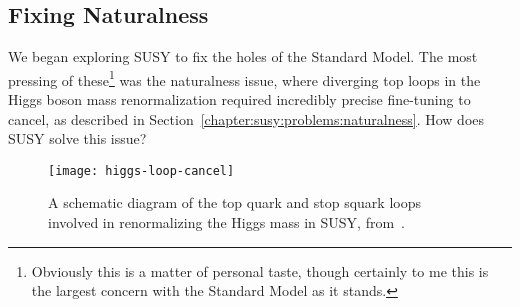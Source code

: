 



\subsection{Fixing Naturalness}

We began exploring SUSY to fix the holes of the Standard Model. The most pressing of these\footnote{Obviously this is a matter of personal taste, though certainly to me this is the largest concern with the Standard Model as it stands.} was the naturalness issue, where diverging top loops in the Higgs boson mass renormalization required incredibly precise fine-tuning to cancel, as described in Section~\ref{chapter:susy:problems:naturalness}. How does SUSY solve this issue?


\begin{figure}
\centering
\texttt{[image: higgs-loop-cancel]}
\caption{A schematic diagram of the top quark and stop squark loops involved in renormalizing the Higgs mass in SUSY, from~\cite{Martin1997}.}
\label{fig:susy:higgs-loop-cancel}
\end{figure}


